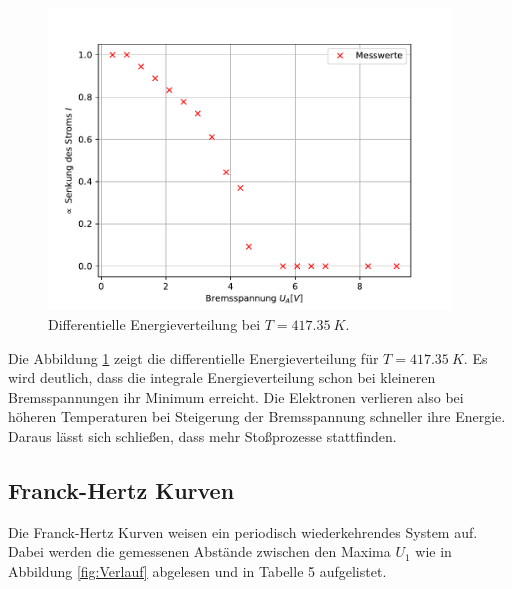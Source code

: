 \begin{figure}[h!]
  \centering
  \includegraphics[height=8cm]{Auswertung/Steigung2.pdf}
  \caption{Differentielle Energieverteilung bei $T = \SI{417.35}{K}$.}
  \label{fig:energy}
\end{figure}
Die Abbildung \ref{fig:energy} zeigt die differentielle Energieverteilung für $T = \SI{417.35}{K}$.
Es wird deutlich, dass die integrale Energieverteilung schon bei kleineren Bremsspannungen ihr Minimum erreicht.
Die Elektronen verlieren also bei höheren Temperaturen bei Steigerung der Bremsspannung schneller ihre Energie.
Daraus lässt sich schließen, dass mehr Sto\ss{}prozesse stattfinden.

\subsection{Franck-Hertz Kurven}
Die Franck-Hertz Kurven weisen ein periodisch wiederkehrendes System auf.
Dabei werden die gemessenen Abstände zwischen den Maxima $U_1$ wie in Abbildung \ref{fig:Verlauf} abgelesen und in Tabelle 5 aufgelistet.

